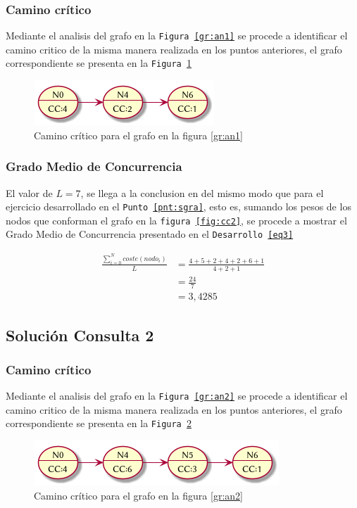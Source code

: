 \documentclass{article}
\begin{document}
\subsubsection{Camino cr\'itico}
Mediante el analisis del grafo en la \texttt{Figura \ref{gr:an1}} se procede
a identificar el camino critico de la misma manera realizada en los puntos anteriores,
el grafo correspondiente se presenta en la \texttt{Figura \ref{fig:an1_cc}}
\begin{figure}[H]
  \centering
  \includegraphics[width=.4\linewidth]{gr_an1_cc}
  \caption{Camino cr\'itico para el grafo en la figura \ref{gr:an1}}
  \label{fig:an1_cc}
\end{figure}

\subsubsection{Grado Medio de Concurrencia}
El valor de $L=7$, se llega a la conclusion en del mismo modo que para el
ejercicio desarrollado en el \texttt{Punto \ref{pnt:sgra}}, esto es, sumando
los pesos de los nodos que conforman
el grafo en la \texttt{figura \ref{fig:cc2}}, se procede a mostrar
el Grado Medio de Concurrencia presentado en el \texttt{Desarrollo \ref{eq3}}

\begin{equation} \label{eq3}
\begin{split}
\frac{\sum_{i=0}^{N} coste(nodo_{i})}{L} & =  \frac{4 + 5 + 2 + 4 + 2 + 6 + 1}{4 + 2 + 1} \\
 & = \frac{24}{7} \\
 & = 3,4285
\end{split}
\end{equation}

\subsection{Soluci\'on Consulta 2}
\subsubsection{Camino cr\'itico}
Mediante el analisis del grafo en la \texttt{Figura
\ref{gr:an2}} se procede a identificar el camino critico de la misma manera
realizada en los puntos anteriores, el grafo correspondiente se presenta en la
\texttt{Figura \ref{fig:an2_cc}}
\begin{figure}[H]
  \centering
  \includegraphics[width=.4\linewidth]{gr_an2_cc}
  \caption{Camino cr\'itico para el grafo en la figura \ref{gr:an2}}
  \label{fig:an2_cc}
\end{figure}
\end{document}
